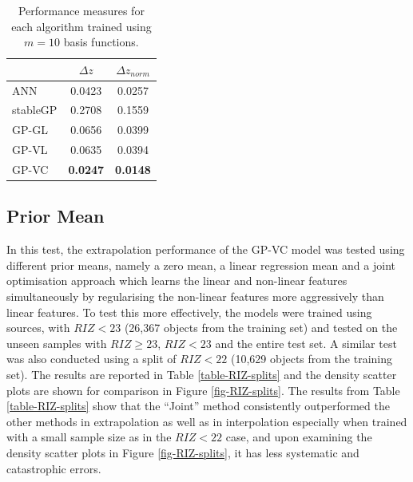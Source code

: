 \documentclass[useAMS,usenatbib,fleqn]{mn2e}
\begin{document}
 \begin{table}
\caption{Performance measures for each algorithm trained using $m=10$ basis functions.}
\begin{center}
  \begin{tabular}{| l | c | c | }
     				&	$\Delta z$	&	$\Delta z_{norm}$	\\	\hline
	ANN			&	0.0423			&	0.0257				\\
	stableGP		&	0.2708			&	0.1559				\\
	GP-GL		&	0.0656			&	0.0399				\\
	GP-VL		&	0.0635			&	0.0394				\\
	GP-VC		&	\textbf{0.0247}		&	\textbf{0.0148}			\\	\hline
  \end{tabular}
  \label{table-experiment-1}
\end{center}
\end{table}

\subsection{Prior Mean}

In this test, the extrapolation performance of the GP-VC model was tested using different prior means, namely a zero mean, a linear regression mean and a joint optimisation approach which learns the linear and non-linear features simultaneously by regularising the non-linear features more aggressively than linear features. To test this more effectively,  the models were trained using sources, with $RIZ<23$ (26,367 objects from the training set) and tested on the unseen samples with $RIZ\ge23$, $RIZ<23$ and the entire test set. A similar test was also conducted using a split of $RIZ<22$ (10,629 objects  from the training set). The results are reported in Table \ref{table-RIZ-splits} and the density scatter plots are shown for comparison in Figure \ref{fig-RIZ-splits}. The results from Table \ref{table-RIZ-splits} show that the ``Joint'' method consistently outperformed the other methods in extrapolation as well as in interpolation especially when trained with a small sample size as in the $RIZ<22$ case, and upon examining the density scatter plots in Figure \ref{fig-RIZ-splits}, it has less systematic and catastrophic errors.
\end{document}
